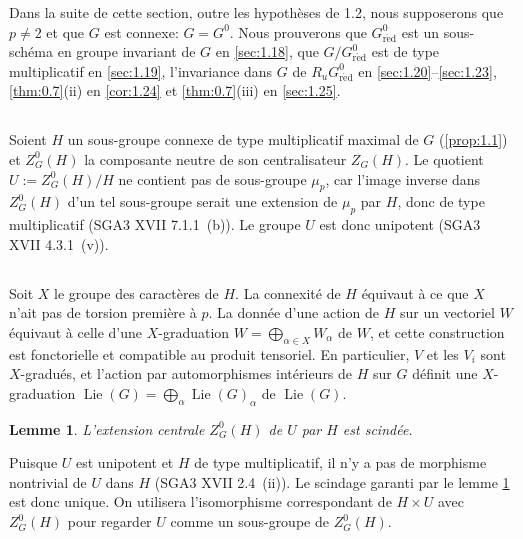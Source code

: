 \documentclass[11pt,a4paper]{article}
\theoremstyle{plain}
\newtheorem{lemma}[theorem]{Lemme}
\theoremstyle{definition}
\DeclareMathOperator{\Lie}{Lie}
\newcommand{\red}{\mathrm{r\acute{e}d}}
\begin{document}
Dans la suite de cette section, outre les hypoth\`eses de 1.2, nous supposerons que $p \neq 2$ et que $G$ est connexe: $G = G^0$. Nous prouverons que $G^0_\red$ est un sous-sch\'ema en groupe invariant de $G$ en \ref{sec:1.18}, que $G/G^0_\red$ est de type multiplicatif en \ref{sec:1.19}, l'invariance dans $G$ de $R_u G^0_\red$ en \ref{sec:1.20}--\ref{sec:1.23}, \ref{thm:0.7}(ii) en \ref{cor:1.24} et \ref{thm:0.7}(iii) en \ref{sec:1.25}.

\subsection{}
Soient $H$ un sous-groupe connexe de type multiplicatif maximal de $G$ (\ref{prop:1.1}) et $Z^0_G(H)$ la composante neutre de son centralisateur $Z_G(H)$. Le quotient $U := Z^0_G(H)/H$ ne contient pas de sous-groupe $\mu_p$, car l'image inverse dans $Z^0_G(H)$ d'un tel sous-groupe serait une extension de $\mu_p$ par $H$, donc de type multiplicatif (SGA3 XVII 7.1.1~(b)). Le groupe $U$ est donc unipotent (SGA3 XVII 4.3.1~(v)).

\subsection{}
Soit $X$ le groupe des caract\`eres de $H$. La connexit\'e de $H$ \'equivaut \`a ce que $X$ n'ait pas de torsion premi\`ere \`a $p$. La donn\'ee d'une action de $H$ sur un vectoriel $W$ \'equivaut \`a celle d'une $X$-graduation $W = \bigoplus_{\alpha \in X} W_\alpha$ de $W$, et cette construction est fonctorielle et compatible au produit tensoriel. En particulier, $V$ et les $V_i$ sont $X$-gradu\'es, et l'action par automorphismes int\'erieurs de $H$ sur $G$ d\'efinit une $X$-graduation $\Lie(G) = \bigoplus_\alpha \Lie(G)_\alpha$ de $\Lie(G)$.

\begin{lemma}\label{lem:1.7}
L'extension centrale $Z^0_G(H)$ de $U$ par $H$ est scind\'ee.
\end{lemma}

Puisque $U$ est unipotent et $H$ de type multiplicatif, il n'y a pas de morphisme nontrivial de $U$ dans $H$ (SGA3 XVII 2.4~(ii)). Le scindage garanti par le lemme \ref{lem:1.7} est donc unique. On utilisera l'isomorphisme correspondant de $H \times U$ avec $Z^0_G(H)$ pour regarder $U$ comme un sous-groupe de $Z^0_G(H)$.
\end{document}
